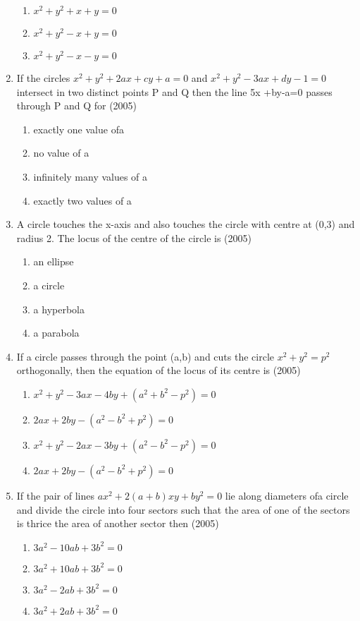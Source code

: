 \documentclass[12pt]{article}
\begin{document}
\begin{enumerate}
\begin{enumerate}
\item  $x^2+y^2+x+y=0$
\item  $x^2+y^2-x+y=0$
\item  $x^2+y^2-x-y=0$
\end{enumerate}
\item If the circles $x^2+y^2+2ax+cy+a=0$ and $x^2+y^2-3ax+dy-1=0$ intersect in two distinct points P and Q then the line 5x +by-a=0 passes through P and Q for (2005)
\begin{enumerate}
\item exactly one value ofa
\item no value of a
\item infinitely many values of a
\item  exactly two values of a
\end{enumerate}
\item A circle touches the x-axis and also touches the circle with centre at (0,3) and radius 2. The locus of the centre of the circle is  (2005)
\begin{enumerate}
\item an ellipse
\item a circle
\item a hyperbola
\item a parabola
\end{enumerate}
\item  If a circle passes through the point (a,b) and cuts the circle $x^2+y^2=p^2$ orthogonally, then the equation of the locus of its centre is (2005)
\begin{enumerate}
\item $x^2+y^2-3ax-4by+(a^2+b^2-p^2)=0$
\item $2ax+2by-(a^2-b^2+p^2)=0$
\item $x^2+y^2-2ax-3by+(a^2-b^2-p^2)=0$
\item $2ax+2by-(a^2-b^2+p^2)=0$
\end{enumerate}
\item If the pair of lines $ax^2+2(a+b)xy+by^2=0$ lie along diameters ofa circle and divide the circle into four sectors such that the area of one of the sectors is thrice the area of another sector then (2005)
\begin{enumerate}
\item $3a^2-10ab+3b^2=0$ 
\item $3a^2+10ab+3b^2=0$ 
\item $3a^2-2ab+3b^2=0$ 
\item $3a^2+2ab+3b^2=0$ 
\end{enumerate}

\end{enumerate}
\end{document}
